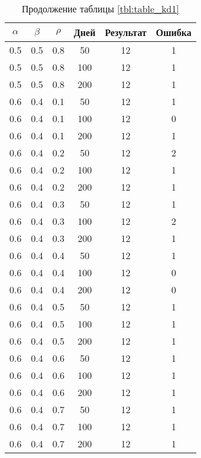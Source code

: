\begin{table}[h]
	\begin{center}
        \begin{threeparttable}
        \captionsetup{justification=raggedright,singlelinecheck=off}
		\caption*{Продолжение таблицы \ref{tbl:table_kd1}}
		\begin{tabular}{|c|c|c|c|c|c|}
  	\hline
	$\alpha$ & $\beta$ & $\rho$ & Дней & Результат & Ошибка \\\hline
	0.5 &  0.5 &  0.8 &   50 &    12 &     1 \\
	0.5 &  0.5 &  0.8 &  100 &    12 &     1 \\
	0.5 &  0.5 &  0.8 &  200 &    12 &     1 \\
   \hline
	0.6 &  0.4 &  0.1 &   50 &    12 &     1 \\
	0.6 &  0.4 &  0.1 &  100 &    12 &     0 \\
	0.6 &  0.4 &  0.1 &  200 &    12 &     1 \\
   \hline
	0.6 &  0.4 &  0.2 &   50 &    12 &     2 \\
	0.6 &  0.4 &  0.2 &  100 &    12 &     1 \\
	0.6 &  0.4 &  0.2 &  200 &    12 &     1 \\
   \hline
	0.6 &  0.4 &  0.3 &   50 &    12 &     1 \\
	0.6 &  0.4 &  0.3 &  100 &    12 &     2 \\
	0.6 &  0.4 &  0.3 &  200 &    12 &     1 \\
   \hline
	0.6 &  0.4 &  0.4 &   50 &    12 &     1 \\
	0.6 &  0.4 &  0.4 &  100 &    12 &     0 \\
	0.6 &  0.4 &  0.4 &  200 &    12 &     0 \\
   \hline
	0.6 &  0.4 &  0.5 &   50 &    12 &     1 \\
	0.6 &  0.4 &  0.5 &  100 &    12 &     1 \\
	0.6 &  0.4 &  0.5 &  200 &    12 &     1 \\
   \hline
	0.6 &  0.4 &  0.6 &   50 &    12 &     1 \\
	0.6 &  0.4 &  0.6 &  100 &    12 &     1 \\
	0.6 &  0.4 &  0.6 &  200 &    12 &     1 \\
   \hline
	0.6 &  0.4 &  0.7 &   50 &    12 &     1 \\
	0.6 &  0.4 &  0.7 &  100 &    12 &     1 \\
	0.6 &  0.4 &  0.7 &  200 &    12 &     1 \\

\end{tabular}
\end{threeparttable}
\end{center}
\end{table}
